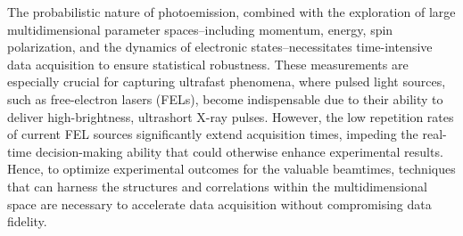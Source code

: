 



The probabilistic nature of photoemission, combined with the exploration of large multidimensional parameter spaces--including momentum, energy, spin polarization, and the dynamics of electronic states--necessitates time-intensive data acquisition to ensure statistical robustness. These measurements are especially crucial for capturing ultrafast phenomena, where pulsed light sources, such as free-electron lasers (FELs), become indispensable due to their ability to deliver high-brightness, ultrashort X-ray pulses. However, the low repetition rates of current FEL sources significantly extend acquisition times, impeding the real-time decision-making ability that could otherwise enhance experimental results. Hence, to optimize experimental outcomes for the valuable beamtimes, techniques that can harness the structures and correlations within the multidimensional space are necessary to accelerate data acquisition without compromising data fidelity.

